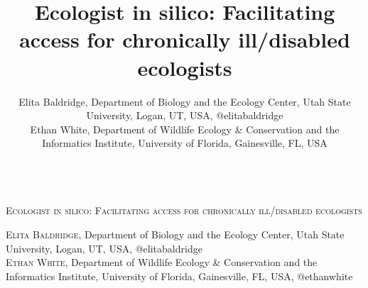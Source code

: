 \documentclass{beamer}
\author{Elita Baldridge, Department of Biology and the Ecology Center, Utah State University, Logan, UT, USA, @elitabaldridge  \\Ethan White, Department of Wildlife Ecology \& Conservation and the Informatics Institute, University of Florida, Gainesville, FL, USA}
\title[17pt]{Ecologist in silico: Facilitating access for chronically ill/disabled ecologists}
\date{}
\begin{document}
\begin{center} 
\begin{huge}
\textsc{%
\\Ecologist in silico: Facilitating access for chronically ill/disabled ecologists\\
 }
\end{huge}  
\begin{large}
\textsc{Elita Baldridge}, Department of Biology and the Ecology Center, Utah State University, Logan, UT, USA, @elitabaldridge\\  
\textsc{Ethan White}, Department of Wildlife Ecology \& Conservation and the Informatics Institute, University of Florida, Gainesville, FL, USA, @ethanwhite\\
\end{large}
\end{center}
\end{document}
